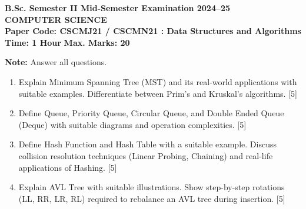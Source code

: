 \documentclass[11pt,a4paper]{article}
\begin{document}
\begin{center}
    {\Large   \textbf{B.Sc. Semester II Mid-Semester Examination 2024--25}}\\[4pt]
    {\large   \textbf{COMPUTER SCIENCE}}\\[4pt]
   \textbf{Paper Code: CSCMJ21 / CSCMN21 : Data Structures and Algorithms}\\[6pt]
   \textbf{Time: 1 Hour} \hfill   \textbf{Max. Marks: 20}
\end{center}
\hr




\noindent   \textbf{Note:} Answer all questions.


\begin{enumerate}[label=   \textbf{\arabic*.}]
    \item Explain Minimum Spanning Tree (MST) and its real-world applications with suitable examples. Differentiate between Prim's and Kruskal's algorithms. \hfill [5]
    
    \item Define Queue, Priority Queue, Circular Queue, and Double Ended Queue (Deque) with suitable diagrams and operation complexities. \hfill [5]
    
    \item Define Hash Function and Hash Table with a suitable example. Discuss collision resolution techniques (Linear Probing, Chaining) and real-life applications of Hashing. \hfill [5]
    
    \item Explain AVL Tree with suitable illustrations. Show step-by-step rotations (LL, RR, LR, RL) required to rebalance an AVL tree during insertion. \hfill [5]
\end{enumerate}
\end{document}

